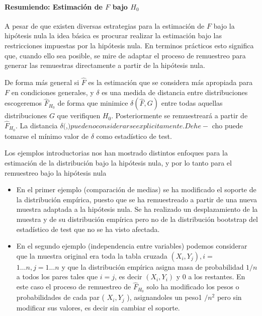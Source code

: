 \documentclass[
]{article}
\providecommand{\tightlist}{%
  \setlength{\itemsep}{0pt}\setlength{\parskip}{0pt}}
\begin{document}
\paragraph{\texorpdfstring{Resumiendo: Estimación de \(F\) bajo \(H_{0}\)}{Resumiendo: Estimación de F bajo H\_\{0\}}}\label{resumiendo-estimaciuxf3n-de-f-bajo-h_0}

A pesar de que existen diversas estrategias para la estimación de \(F\) bajo la hipótesis nula la idea básica es procurar realizar la estimación bajo las restricciones impuestas por la hipótesis nula. En terminos prácticos esto significa que, cuando ello sea posible, se mire de adaptar el proceso de remuestreo para generar las remuestras directamente a partir de la hipótesis nula.

De forma más general si \(\hat{F}\) es la estimación que se considera más apropiada para \(F\) en condiciones generales, y \(\delta\) es una medida de distancia entre distribuciones escogeremos \(\hat{F}_{H_{0}}\) de forma que minimice \(\delta(\hat{F}, G)\) entre todas aquellas distribuciones \(G\) que verifiquen \(H_{0}\). Posteriormente se remuestreará a partir de \(\hat{F}_{H_{0}}\). La distancia \(\delta(\),\() puede no considerarse explicitamente. De he-\) cho puede tomarse el mínimo valor de \(\delta\) como estadístico de test.

Los ejemplos introductorias nos han mostrado distintos enfoques para la estimación de la distribución bajo la hipótesis nula, y por lo tanto para el remuestreo bajo la hipótesis nula

\begin{itemize}
\tightlist
\item
  En el primer ejemplo (comparación de medias) se ha modificado el soporte de la distribución empírica, puesto que se ha remuestreado a partir de una nueva muestra adaptada a la hipótesis nula. Se ha realizado un desplazamiento de la muestra y de su distribución empírica pero no de la distribución bootstrap del estadístico de test que no se ha visto afectada.
\item
  En el segundo ejemplo (independencia entre variables) podemos considerar que la muestra original era toda la tabla cruzada \(\left(X_{i}, Y_{j}\right), i=\)
  \(1 \ldots n, j=1 \ldots n\) y que la distribución empírica asigna masa de probabilidad \(1 / n\) a todos los pares tales que \(i=j\), es decir \(\left(X_{i}, Y_{i}\right)\) y 0 a los restantes. En este caso el proceso de remuestreo de \(\hat{F}_{H_{0}}\) solo ha modificado los pesos o probabilidades de cada par ( \(X_{i}, Y_{j}\) ), asignandoles un peso1 \(/ n^{2}\) pero sin modificar sus valores, es decir sin cambiar el soporte.
\end{itemize}
\end{document}
